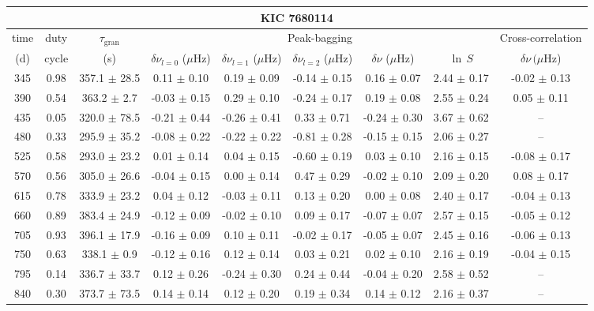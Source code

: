\documentclass[twocolumn]{aastex61}%
\begin{document}
\begin{table*}[ht]\centering\fontsize{9.}{7.}\selectfont
\begin{tabular}{ccc|ccccc|c}
\multicolumn{9}{c}{KIC 7680114}\\ \hline\hline
time & duty & $\tau_\text{gran}$ &\multicolumn{5}{c|}{Peak-bagging}&Cross-correlation\\
(d)& cycle & (s)&$\delta\nu_{l=0}$ ($\mu$Hz) & $\delta\nu_{l=1}$ ($\mu$Hz) & $\delta\nu_{l=2}$ ($\mu$Hz) & $\delta\nu$ ($\mu$Hz)& $\ln\,S$ & $\delta\nu\,(\mu$Hz)\\\hline
345 & 0.98 & 357.1 $\pm$ 28.5 & 0.11 $\pm$ 0.10 & 0.19 $\pm$ 0.09 & -0.14 $\pm$ 0.15 & 0.16 $\pm$ 0.07 & 2.44 $\pm$ 0.17 & -0.02 $\pm$ 0.13\\
390 & 0.54 & 363.2 $\pm$ 2.7 & -0.03 $\pm$ 0.15 & 0.29 $\pm$ 0.10 & -0.24 $\pm$ 0.17 & 0.19 $\pm$ 0.08 & 2.55 $\pm$ 0.24 & 0.05 $\pm$ 0.11\\
435 & 0.05 & 320.0 $\pm$ 78.5 & -0.21 $\pm$ 0.44 & -0.26 $\pm$ 0.41 & 0.33 $\pm$ 0.71 & -0.24 $\pm$ 0.30 & 3.67 $\pm$ 0.62 & --\\
480 & 0.33 & 295.9 $\pm$ 35.2 & -0.08 $\pm$ 0.22 & -0.22 $\pm$ 0.22 & -0.81 $\pm$ 0.28 & -0.15 $\pm$ 0.15 & 2.06 $\pm$ 0.27 & --\\
525 & 0.58 & 293.0 $\pm$ 23.2 & 0.01 $\pm$ 0.14 & 0.04 $\pm$ 0.15 & -0.60 $\pm$ 0.19 & 0.03 $\pm$ 0.10 & 2.16 $\pm$ 0.15 & -0.08 $\pm$ 0.17\\
570 & 0.56 & 305.0 $\pm$ 26.6 & -0.04 $\pm$ 0.15 & 0.00 $\pm$ 0.14 & 0.47 $\pm$ 0.29 & -0.02 $\pm$ 0.10 & 2.09 $\pm$ 0.20 & 0.08 $\pm$ 0.17\\
615 & 0.78 & 333.9 $\pm$ 23.2 & 0.04 $\pm$ 0.12 & -0.03 $\pm$ 0.11 & 0.13 $\pm$ 0.20 & 0.00 $\pm$ 0.08 & 2.40 $\pm$ 0.17 & -0.04 $\pm$ 0.13\\
660 & 0.89 & 383.4 $\pm$ 24.9 & -0.12 $\pm$ 0.09 & -0.02 $\pm$ 0.10 & 0.09 $\pm$ 0.17 & -0.07 $\pm$ 0.07 & 2.57 $\pm$ 0.15 & -0.05 $\pm$ 0.12\\
705 & 0.93 & 396.1 $\pm$ 17.9 & -0.16 $\pm$ 0.09 & 0.10 $\pm$ 0.11 & -0.02 $\pm$ 0.17 & -0.05 $\pm$ 0.07 & 2.45 $\pm$ 0.16 & -0.06 $\pm$ 0.13\\
750 & 0.63 & 338.1 $\pm$ 0.9 & -0.12 $\pm$ 0.16 & 0.12 $\pm$ 0.14 & 0.03 $\pm$ 0.21 & 0.02 $\pm$ 0.10 & 2.16 $\pm$ 0.19 & -0.04 $\pm$ 0.15\\
795 & 0.14 & 336.7 $\pm$ 33.7 & 0.12 $\pm$ 0.26 & -0.24 $\pm$ 0.30 & 0.24 $\pm$ 0.44 & -0.04 $\pm$ 0.20 & 2.58 $\pm$ 0.52 & --\\
840 & 0.30 & 373.7 $\pm$ 73.5 & 0.14 $\pm$ 0.14 & 0.12 $\pm$ 0.20 & 0.19 $\pm$ 0.34 & 0.14 $\pm$ 0.12 & 2.16 $\pm$ 0.37 & --\\

\end{tabular}
\end{table*}
\end{document}
